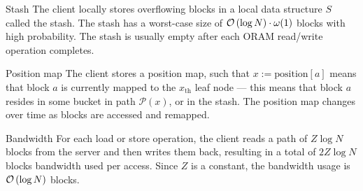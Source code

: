 		\begin{frame}{\subsecname}
			
			\begin{block}{Stash}
				The client locally stores overflowing blocks in a local data structure $S$ called the stash.
				The stash has a worst-case size of $\mathcal{O}\left(\log N\right) \cdot \omega (1)$ blocks with high probability.
				The stash is usually empty after each ORAM read/write operation completes.
			\end{block} 

		\end{frame}

		\begin{frame}{\subsecname}
			
			\begin{block}{Position map}
				The client stores a position map, such that $x := \text{position}[a]$ means that block $a$ is currently mapped to the $x_\text{th}$ leaf node --- this means that block $a$ resides in some bucket in path $\mathcal{P}(x)$, or in the stash. 
				The position map changes over time as blocks are accessed and remapped.
			\end{block} 

		\end{frame}

		\begin{frame}{\subsecname}
			
			\begin{block}{Bandwidth}
				For each load or store operation, the client reads a path of $Z \log N$ blocks from the server and then writes them back, resulting in a total of $2Z \log N$ blocks bandwidth used per access. 
				Since $Z$ is a constant, the bandwidth usage is $\mathcal{O}\left(\log N\right)$ blocks.
			\end{block} 

		\end{frame}

